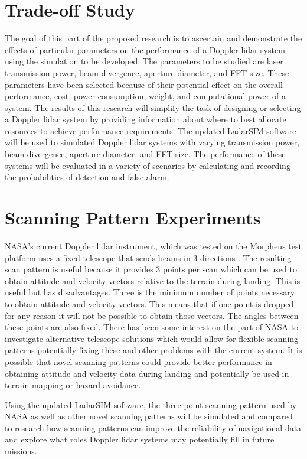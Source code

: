 \section{Trade-off Study}
The goal of this part of the proposed research is to ascertain and demonstrate the effects
of particular parameters on the performance of a Doppler lidar system using
the simulation to be developed.
The parameters to be studied are laser transmission power, beam divergence,
aperture diameter, and FFT size.
These parameters have been selected because of their potential effect on
the overall performance, cost, power consumption, weight, and computational
power of a system.
The results of this research will simplify the task of designing or selecting
a Doppler lidar system by providing information about where to best allocate
resources to achieve performance requirements. The updated LadarSIM software
will be used to simulated Doppler lidar systems with varying transmission 
power, beam divergence, aperture diameter, and FFT size. The performance of 
these systems will be evaluated in a variety of scenarios by calculating and
recording the probabilities of detection and false alarm. 

\section{Scanning Pattern Experiments}
NASA's current Doppler lidar instrument, which was tested on the Morpheus test 
platform uses a fixed telescope that sends beams in 3 directions \cite{amz12,amz12fiber,amz12p2,amz16coherent}.
The resulting scan pattern is useful because it provides 3 points per scan which can 
be used to obtain attitude and velocity vectors relative to the terrain during landing.
This is useful but has disadvantages. Three is the minimum number of points necessary 
to obtain attitude and velocity vectors. This means that if one point is dropped for any reason
it will not be possible to obtain those vectors. The angles between these points are also fixed.
There has been some interest on the 
part of NASA to investigate alternative telescope solutions which would allow for 
flexible scanning patterns potentially fixing these and other problems with the current
system\cite{budge2016simulation}. It is possible that novel scanning patterns could
provide better performance in obtaining attitude and velocity data during landing and
potentially be used in terrain mapping or hazard avoidance. 

Using the updated LadarSIM software, the three point scanning pattern used by NASA as
well as other novel scanning patterns will be simulated and compared to research how
scanning patterns can improve the reliability of navigational data and explore what 
roles Doppler lidar systems may potentially fill in future missions.  


